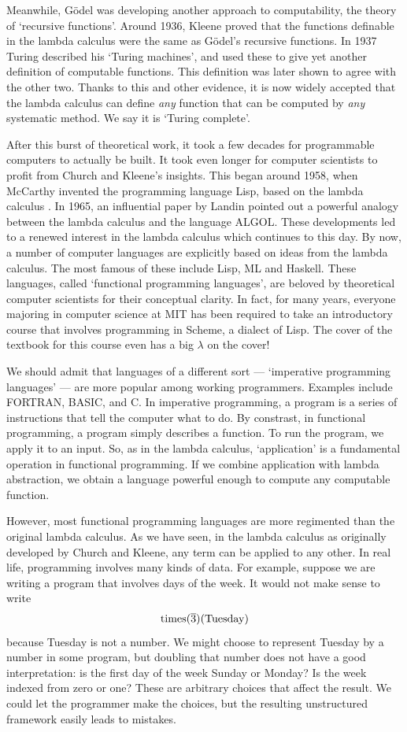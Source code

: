 \documentclass[12pt,twoside,openright]{report}
\newcommand{\Times}{{\rm times}}
\newcommand{\Tuesday}{{\rm Tuesday}}
\begin{document}
Meanwhile, G\"odel was developing another approach to computability, the theory of `recursive functions'.  Around 1936, Kleene proved that the functions definable in the lambda calculus were the same as G\"odel's recursive functions.  In 1937 Turing described his `Turing machines', and used these to give yet another definition of computable functions.  This definition was later shown to agree with the other two.  Thanks to this and other evidence, it is now widely accepted that the lambda calculus can define {\it any} function that can be computed by {\it any} systematic method.  We say it is `Turing complete'.

After this burst of theoretical work, it took a few decades for programmable computers to actually be built.  It took even longer for computer scientists to profit from Church and Kleene's insights. This began around 1958, when McCarthy invented the programming language Lisp, based on the lambda calculus \cite{McCarthy}. In 1965, an influential paper by Landin \cite{Landin} pointed out a powerful analogy between the lambda calculus and the language ALGOL.    These developments led to a renewed interest in the lambda calculus which continues to this day.  By now, a number of computer languages are explicitly based on ideas from the lambda calculus.  The most famous of these include Lisp, ML and Haskell.  These languages, called `functional programming languages', are beloved by theoretical computer scientists for their conceptual clarity.  In fact, for many years, everyone majoring in computer science at MIT has been required to take an introductory course that involves programming in Scheme, a dialect of Lisp.  The cover of the textbook for this course \cite{Sussman} even has a big $\lambda$ on the cover!

We should admit that languages of a different sort --- `imperative programming languages' --- are more popular among working programmers. Examples include FORTRAN, BASIC, and C.  In imperative programming, a program is a series of instructions that tell the computer what to do. By constrast, in functional programming, a program simply describes a function.  To run the program, we apply it to an input.  So, as in the lambda calculus, `application' is a fundamental operation in functional programming.  If we combine application with lambda abstraction, we obtain a language powerful enough to compute any computable function.  

However, most functional programming languages are more regimented than the original lambda calculus.  As we have seen, in the lambda calculus as originally developed by Church and Kleene, any term can be applied to any other.  In real life, programming involves many kinds of data.  For example, suppose we are writing a program that involves days of the week.  It would not make sense to write 
\[       \Times(\overline{3})(\Tuesday)  \]
because Tuesday is not a number.  We might choose to represent Tuesday by a number in some program, but doubling that number does not have a good interpretation: is the first day of the week Sunday or Monday?
Is the week indexed from zero or one?  These are arbitrary choices that affect the result.  We could let the programmer make the choices, but the resulting unstructured framework easily leads to mistakes.  
\end{document}
